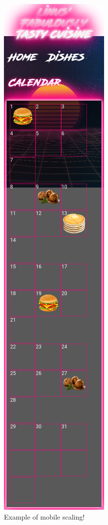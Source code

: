 \documentclass[a4paper]{scrartcl}
\begin{document}
\begin{figure}[H]
  \begin{center}
    \includegraphics[scale=0.35]{images/Scr4.png}
    \caption{Example of mobile scaling!}
    \label{fig:recipe}
  \end{center}
\end{figure}
\end{document}
